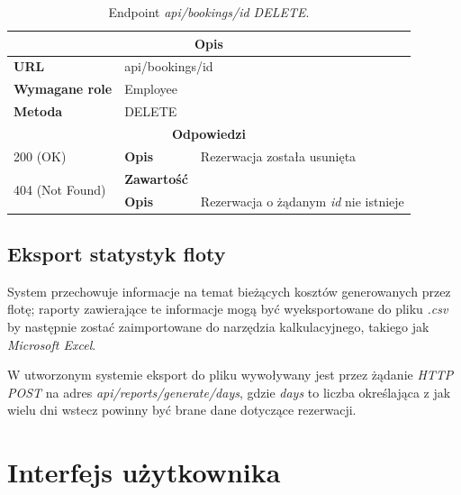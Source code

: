 \documentclass[eng,printmode,openany]{mgr}
\begin{document}
\begin{table}[H]
	\caption{Endpoint \textit{api/bookings/id DELETE}.}
	\begin{tabularx}{\textwidth}{|l|l|X|}
		\hline
		\multicolumn{3}{|c|}{\textbf{\textbf{Opis}}}
		\\ \hline
		\textbf{URL}                       & \multicolumn{2}{l|}{api/bookings/id}
		\\ \hline
		\textbf{Wymagane role}             & \multicolumn{2}{l|}{Employee}
		\\ \hline
		\textbf{Metoda}                    & \multicolumn{2}{l|}{DELETE}
		\\ \hline
		\multicolumn{3}{|c|}{\textbf{Odpowiedzi}}
		\\ \hline
		200 (OK)			                & \textbf{Opis}         	& Rezerwacja została usunięta
		\\ \hline
		\multirow{2}{*}{404 (Not Found)} 	& \textbf{Zawartość}     & 
		\\ \cline{2-3}                      & \textbf{Opis}          & Rezerwacja o żądanym \textit{id} nie istnieje
		\\ \hline
	\end{tabularx}
\end{table}

	
	\newpage
	\subsection{Eksport statystyk floty}
	System przechowuje informacje na temat bieżących kosztów generowanych przez flotę; raporty zawierające te informacje mogą być wyeksportowane do pliku \textit{.csv} by następnie zostać zaimportowane do narzędzia kalkulacyjnego, takiego jak \textit{Microsoft Excel}.
	
	W utworzonym systemie eksport do pliku wywoływany jest przez żądanie \textit{HTTP POST} na adres \textit{api/reports/generate/days}, gdzie \textit{days} to liczba określająca z jak wielu dni wstecz powinny być brane dane dotyczące rezerwacji.
	
	

	\newpage	
	\section{Interfejs użytkownika}
\end{document}

